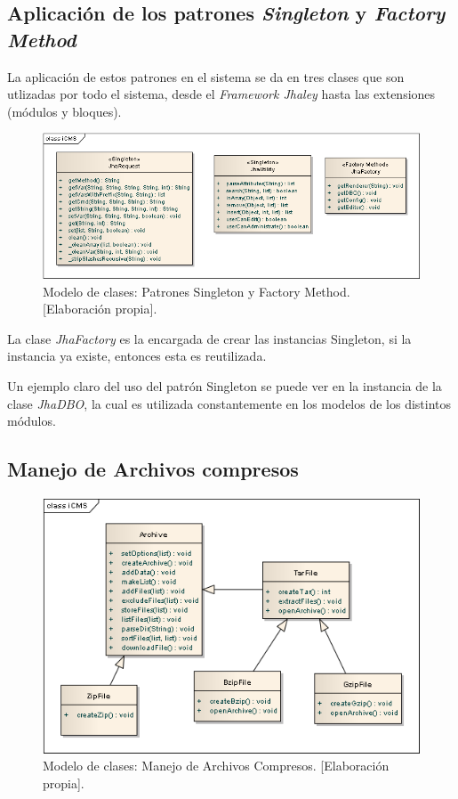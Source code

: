 \subsection{Aplicaci\'on de los patrones \textit{Singleton} y \textit{Factory Method}}
La aplicaci\'on de estos patrones en el sistema se da en tres clases que son utlizadas por todo el sistema, desde el \textit{Framework Jhaley} hasta las extensiones (m\'odulos y bloques).\\

\begin{figure}[h]
\centering
\includegraphics[scale=.5, keepaspectratio=true]{imagenes/04_imagen.png}
\caption{Modelo de clases: Patrones Singleton y Factory Method. [Elaboraci\'on propia].}
\end{figure}

La clase \emph{JhaFactory} es la encargada de crear las instancias Singleton, si la instancia ya existe, entonces esta es reutilizada.



Un ejemplo claro del uso del patr\'on Singleton se puede ver en la instancia de la clase \emph{JhaDBO}, la cual es utilizada constantemente en los modelos de los distintos m\'odulos.



\subsection{Manejo de Archivos compresos}

\begin{figure}[h]
\centering
\includegraphics[scale=.4, keepaspectratio=true]{imagenes/05_imagen.png}
\caption{Modelo de clases: Manejo de Archivos Compresos. [Elaboraci\'on propia].}
\end{figure}

